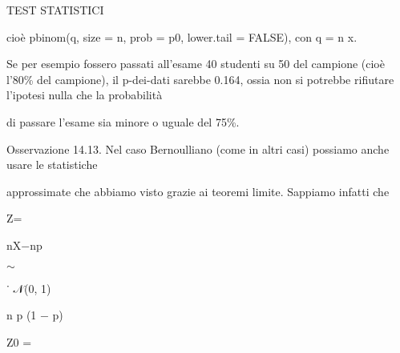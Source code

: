 \documentclass[a4paper,portrait,12pt]{article}
\begin{document}





\begin{flushleft}
TEST STATISTICI
\end{flushleft}





\begin{flushleft}
cio\`{e} pbinom(q, size = n, prob = p0, lower.tail = FALSE), con q = n x.
\end{flushleft}


\begin{flushleft}
Se per esempio fossero passati all'esame 40 studenti su 50 del campione (cio\`{e} l'80\% del campione), il p-dei-dati sarebbe 0.164, ossia non si potrebbe rifiutare l'ipotesi nulla che la probabilit\`{a}
\end{flushleft}


\begin{flushleft}
di passare l'esame sia minore o uguale del 75\%.
\end{flushleft}


\begin{flushleft}
Osservazione 14.13. Nel caso Bernoulliano (come in altri casi) possiamo anche usare le statistiche
\end{flushleft}


\begin{flushleft}
approssimate che abbiamo visto grazie ai teoremi limite. Sappiamo infatti che
\end{flushleft}


\begin{flushleft}
Z=
\end{flushleft}





\begin{flushleft}
nX$-$np
\end{flushleft}


$\sim$


\begin{flushleft}
˙ 𝒩(0, 1)
\end{flushleft}


\begin{flushleft}
n p (1 $-$ p)
\end{flushleft}





\begin{flushleft}
Z0 =
\end{flushleft}
\end{document}
